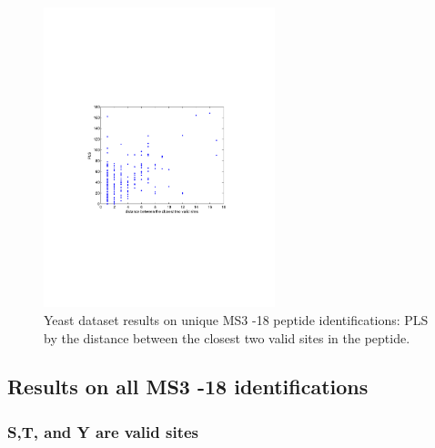 \begin{figure}[htbp]
\centering %
\includegraphics[trim = 0mm 90mm 20mm 90mm,clip,width=0.6\textwidth]{fig/phospho/uniqueIds/PLS_figs/uniqIds_PLS_by_valid_site_distance.pdf}
\caption{Yeast dataset results on unique MS3 -18 peptide identifications: PLS by the distance between the closest two valid sites in the peptide.}
\label{fig:yeast_pls}
\end{figure}


\clearpage
\subsection{Results on all MS3 -18 identifications}

\subsubsection{S,T, and Y are valid sites}

